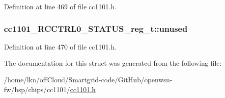 Definition at line 469 of file cc1101.\+h.

\subsubsection[{\texorpdfstring{unused}{unused}}]{ cc1101\+\_\+\+R\+C\+C\+T\+R\+L0\+\_\+\+S\+T\+A\+T\+U\+S\+\_\+reg\+\_\+t\+::unused}\hypertarget{structcc1101___r_c_c_t_r_l0___s_t_a_t_u_s__reg__t_a9dbf7315fb3a56b8b213282fe943b459}{}\label{structcc1101___r_c_c_t_r_l0___s_t_a_t_u_s__reg__t_a9dbf7315fb3a56b8b213282fe943b459}


Definition at line 470 of file cc1101.\+h.



The documentation for this struct was generated from the following file\+:\begin{DoxyCompactItemize}
\item 
/home/lkn/off\+Cloud/\+Smartgrid-\/code/\+Git\+Hub/openwsn-\/fw/bsp/chips/cc1101/\hyperlink{cc1101_8h}{cc1101.\+h}\end{DoxyCompactItemize}
